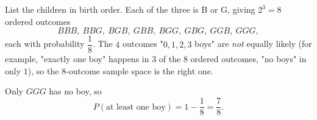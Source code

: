 List the children in birth order. Each of the three is B or G, giving $2^3=8$ ordered outcomes
\[
BBB,\ BBG,\ BGB,\ GBB,\ BGG,\ GBG,\ GGB,\ GGG,
\]
each with probability $\dfrac{1}{8}$. The $4$ outcomes "$0,1,2,3$ boys" are \emph{not} equally likely (for example, "exactly one boy" happens in $3$ of the $8$ ordered outcomes, "no boys" in only $1$), so the $8$-outcome sample space is the right one.

Only $GGG$ has no boy, so
\[
P(\text{at least one boy})=1-\dfrac{1}{8}=\boxed{\dfrac{7}{8}}.
\]
